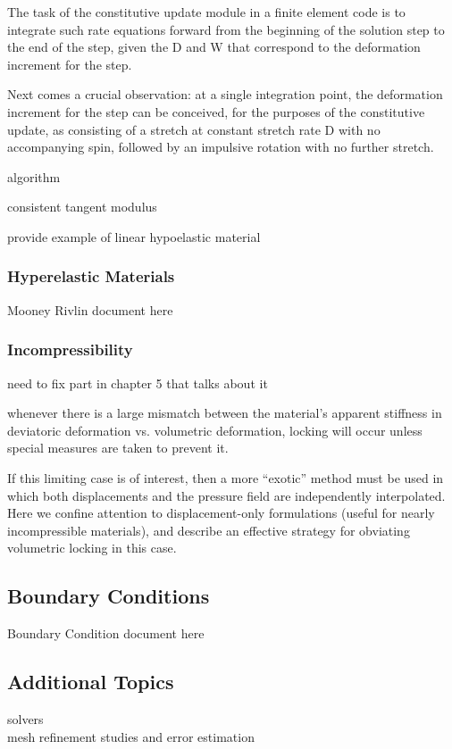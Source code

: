 The task of the constitutive update module in a finite element code is to integrate such rate equations forward from the beginning of the solution step to the end of the step, given the D and W that correspond to the deformation increment for the step.

Next comes a crucial observation: at a single integration point, the deformation increment for the step can be conceived, for the purposes of the constitutive update, as consisting of a stretch at constant stretch rate D with no accompanying spin, followed by an impulsive rotation with no further stretch.

algorithm

consistent tangent modulus

provide example of linear hypoelastic material

\subsubsection{Hyperelastic Materials}
Mooney Rivlin document here

\subsubsection{Incompressibility}
need to fix part in chapter 5 that talks about it

whenever there is a large mismatch between the material’s apparent stiffness in deviatoric deformation vs. volumetric deformation, locking will occur unless special measures are taken to prevent it.

If this limiting case is of interest, then a more “exotic” method must be used in which both displacements and the pressure field are independently interpolated. Here we confine attention to displacement-only formulations (useful for nearly incompressible materials), and describe an effective strategy for obviating volumetric locking in this case.

\subsection{Boundary Conditions}
Boundary Condition document here

\subsection{Additional Topics}
solvers \\
mesh refinement studies and error estimation \\

